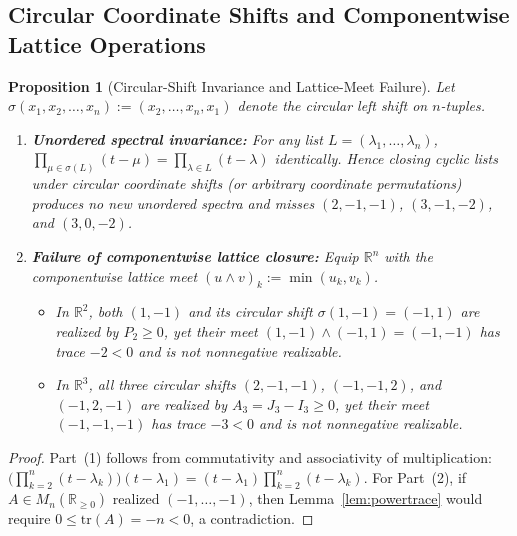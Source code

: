 \documentclass[11pt]{article}
\newtheorem{proposition}[theorem]{Proposition}
\theoremstyle{definition}
\theoremstyle{remark}
\begin{document}
\subsection{Circular Coordinate Shifts and Componentwise Lattice Operations}

\begin{proposition}[Circular-Shift Invariance and Lattice-Meet Failure]\label{prop:lattice}
Let $\sigma(x_1, x_2, \dots, x_n) := (x_2, \dots, x_n, x_1)$ denote the circular left shift
on $n$-tuples.
\begin{enumerate}
  \item \textbf{Unordered spectral invariance:} For any list $L = (\lambda_1, \dots,
    \lambda_n)$, $\prod_{\mu \in \sigma(L)} (t - \mu) = \prod_{\lambda \in L}
    (t - \lambda)$ identically. Hence closing cyclic lists under circular coordinate shifts
    (or arbitrary coordinate permutations) produces no new unordered spectra and misses
    $(2, -1, -1)$, $(3, -1, -2)$, and $(3, 0, -2)$.
  \item \textbf{Failure of componentwise lattice closure:} Equip $\mathbb{R}^n$ with the
    componentwise lattice meet $(u \wedge v)_k := \min(u_k, v_k)$.
    \begin{itemize}
      \item In $\mathbb{R}^2$, both $(1, -1)$ and its circular shift $\sigma(1, -1) =
        (-1, 1)$ are realized by $P_2 \ge 0$, yet their meet $(1, -1) \wedge (-1, 1) =
        (-1, -1)$ has trace $-2 < 0$ and is not nonnegative realizable.
      \item In $\mathbb{R}^3$, all three circular shifts $(2, -1, -1)$, $(-1, -1, 2)$, and
        $(-1, 2, -1)$ are realized by $A_3 = J_3 - I_3 \ge 0$, yet their meet $(-1, -1, -1)$
        has trace $-3 < 0$ and is not nonnegative realizable.
    \end{itemize}
\end{enumerate}
\end{proposition}

\begin{proof}
Part~(1) follows from commutativity and associativity of multiplication:
$\bigl(\prod_{k=2}^n (t - \lambda_k)\bigr)(t - \lambda_1) = (t - \lambda_1)\prod_{k=2}^n
(t - \lambda_k)$. For Part~(2), if $A \in M_n(\mathbb{R}_{\ge 0})$ realized $(-1, \dots,
-1)$, then Lemma~\ref{lem:powertrace} would require $0 \le \mathrm{tr}(A) = -n < 0$, a
contradiction.
\end{proof}
\end{document}
